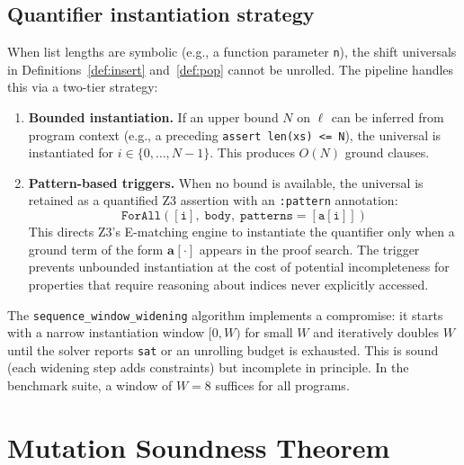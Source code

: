 \documentclass[11pt]{article}
\newcommand{\arrvar}[1]{\mathbf{a}_{#1}}
\newcommand{\lenvar}[1]{\ell_{#1}}
\newcommand{\idx}{i}
\begin{document}
\subsection{Quantifier instantiation strategy}\label{sec:quantinst}

When list lengths are symbolic (e.g., a function parameter \texttt{n}),
the shift universals in Definitions~\ref{def:insert} and~\ref{def:pop}
cannot be unrolled.  The pipeline handles this via a two-tier strategy:

\begin{enumerate}[label=(\roman*),nosep]
  \item \textbf{Bounded instantiation.}  If an upper bound $N$ on
        $\lenvar{}$ can be inferred from program context (e.g., a preceding
        \texttt{assert len(xs) <= N}), the universal is instantiated for
        $\idx \in \{0, \ldots, N-1\}$.  This produces $O(N)$ ground clauses.
  \item \textbf{Pattern-based triggers.}  When no bound is available, the
        universal is retained as a quantified Z3 assertion with an
        \texttt{:pattern} annotation:
        \[
          \mathtt{ForAll([i],\; \text{body},\;
          patterns{=}[a[i]])}
        \]
        This directs Z3's E-matching engine to instantiate the quantifier
        only when a ground term of the form $\arrvar{}[\cdot]$ appears in
        the proof search.  The trigger prevents unbounded instantiation at
        the cost of potential incompleteness for properties that require
        reasoning about indices never explicitly accessed.
\end{enumerate}

\begin{remark}\label{rem:widening}
The \texttt{sequence\_window\_widening} algorithm implements a compromise:
it starts with a narrow instantiation window $[0, W)$ for small $W$ and
iteratively doubles $W$ until the solver reports \texttt{sat} or an unrolling
budget is exhausted.  This is sound (each widening step adds constraints) but
incomplete in principle.  In the benchmark suite, a window of $W = 8$ suffices
for all programs.
\end{remark}

\section{Mutation Soundness Theorem}\label{sec:theorem}
\end{document}
